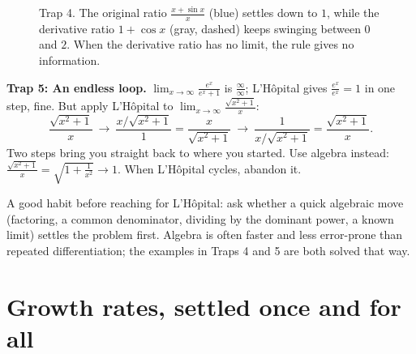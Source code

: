 \begin{figure}[htbp]
\centering
{}
\caption{Trap 4. The original ratio $\tfrac{x+\sin x}{x}$ (blue) settles down to $1$,
while the derivative ratio $1+\cos x$ (gray, dashed) keeps swinging between $0$ and
$2$. When the derivative ratio has no limit, the rule gives no information.}
\label{ch18:fig-trap4}
\end{figure}

\begin{trapbox}
\textbf{Trap 5: An endless loop.} $\displaystyle\lim_{x\to\infty}\frac{e^x}{e^x+1}$ is
$\tfrac{\infty}{\infty}$; L'H\^opital gives $\tfrac{e^x}{e^x}=1$ in one step, fine.
But apply L'H\^opital to $\displaystyle\lim_{x\to\infty}\frac{\sqrt{x^2+1}}{x}$:
\[
\frac{\sqrt{x^2+1}}{x}\ \longrightarrow\ \frac{x/\sqrt{x^2+1}}{1}=\frac{x}{\sqrt{x^2+1}}
\ \longrightarrow\ \frac{1}{x/\sqrt{x^2+1}}=\frac{\sqrt{x^2+1}}{x}.
\]
Two steps bring you straight back to where you started. Use algebra instead:
$\frac{\sqrt{x^2+1}}{x}=\sqrt{1+\tfrac{1}{x^2}}\to 1$. When L'H\^opital
cycles, abandon it.
\end{trapbox}

\begin{recoverybox}
A good habit before reaching for L'H\^opital: ask whether a quick algebraic move
(factoring, a common denominator, dividing by the dominant power, a known limit)
settles the problem first. Algebra is often faster and less
error-prone than repeated differentiation; the
examples in Traps 4 and 5 are both solved that way.
\end{recoverybox}

\section{Growth rates, settled once and for all}

